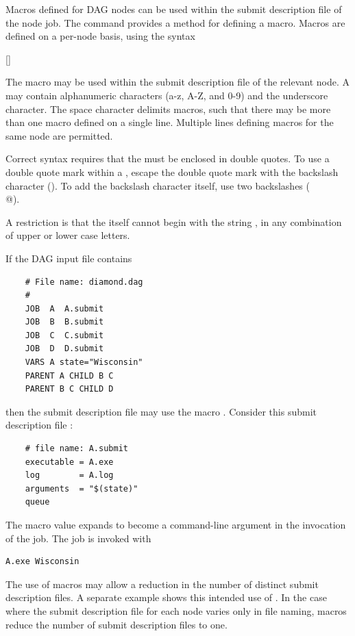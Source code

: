 Macros defined for DAG nodes can be used within the submit description
file of the node job. 
The  command provides a method for defining a macro.
Macros are defined on a per-node basis, using the syntax

   []

The macro may be used within the
submit description file of the relevant node.  
A  may contain alphanumeric characters (a-z, A-Z, and 0-9)
and the underscore character.
The space character delimits macros,
such that there may be more than one macro defined on a single line.
Multiple lines defining macros for the same node are permitted.

Correct syntax requires that the  must be
enclosed in double quotes.
To use a double quote mark within a ,
escape the double quote mark with the backslash character (\verb@\@).
To add the backslash character itself, use two backslashes (\verb@\\@).

A restriction is that the  itself cannot begin with the string
,
in any combination of upper or lower case letters.


If the DAG input file contains
\footnotesize
\begin{verbatim}
    # File name: diamond.dag
    #
    JOB  A  A.submit 
    JOB  B  B.submit 
    JOB  C  C.submit	
    JOB  D  D.submit
    VARS A state="Wisconsin"
    PARENT A CHILD B C
    PARENT B C CHILD D

\end{verbatim}
\normalsize

then the submit description file  may use 
the macro \verb@state@.
Consider this 
submit description file :

\footnotesize
\begin{verbatim}
    # file name: A.submit
    executable = A.exe
    log        = A.log
    arguments  = "$(state)"
    queue
\end{verbatim}
\normalsize
The macro value expands to become a command-line argument in 
the invocation of the job.
The job is invoked with
\footnotesize
\begin{verbatim}
A.exe Wisconsin
\end{verbatim}
\normalsize

The use of macros may allow a reduction in the number 
of distinct submit description files.
A separate example shows this intended use of .
In the case where the submit description file for each node
varies only in file naming, 
macros reduce the number of submit description files to one.

